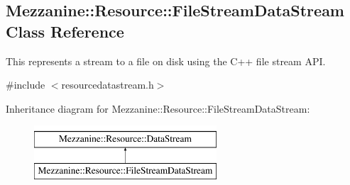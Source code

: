 \hypertarget{classMezzanine_1_1Resource_1_1FileStreamDataStream}{
\subsection{Mezzanine::Resource::FileStreamDataStream Class Reference}
\label{classMezzanine_1_1Resource_1_1FileStreamDataStream}
}


This represents a stream to a file on disk using the C++ file stream API.  




{\ttfamily \#include $<$resourcedatastream.h$>$}

Inheritance diagram for Mezzanine::Resource::FileStreamDataStream:\begin{figure}[H]
\begin{center}
\leavevmode
\includegraphics[height=2.000000cm]{classMezzanine_1_1Resource_1_1FileStreamDataStream}
\end{center}
\end{figure}
